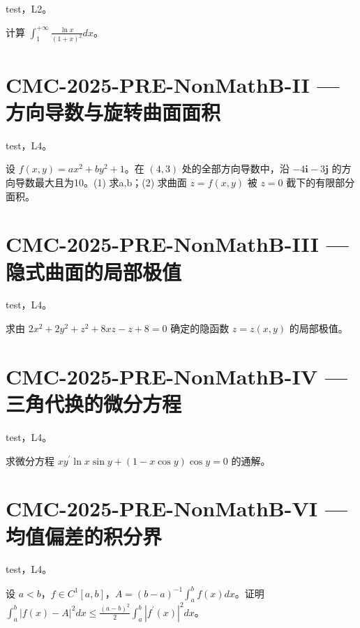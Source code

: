 \documentclass[UTF8]{ctexart}
\begin{document}
test，L2。

计算 $\displaystyle\int_1^{+\infty}\frac{\ln x}{(1+x)^2}dx$。

\section*{CMC-2025-PRE-NonMathB-II — 方向导数与旋转曲面面积}

test，L4。

设 $f(x,y)=ax^2+by^2+1$。在 $(4,3)$ 处的全部方向导数中，沿 $-4\mathbf i-3\mathbf j$ 的方向导数最大且为10。(1) 求a,b；(2) 求曲面 $z=f(x,y)$ 被 $z=0$ 截下的有限部分面积。

\section*{CMC-2025-PRE-NonMathB-III — 隐式曲面的局部极值}

test，L4。

求由 $2x^2+2y^2+z^2+8xz-z+8=0$ 确定的隐函数 $z=z(x,y)$ 的局部极值。

\section*{CMC-2025-PRE-NonMathB-IV — 三角代换的微分方程}

test，L4。

求微分方程 $xy^{\prime}\ln x\sin y+(1-x\cos y)\cos y=0$ 的通解。

\section*{CMC-2025-PRE-NonMathB-VI — 均值偏差的积分界}

test，L4。

设 $a<b$，$f\in C^1[a,b]$，$A=(b-a)^{-1}\int_a^bf(x)dx$。证明 $\displaystyle\int_a^b|f(x)-A|^2dx\le\frac{(a-b)^2}{2}\int_a^b|f^{\prime}(x)|^2dx$。
\end{document}
